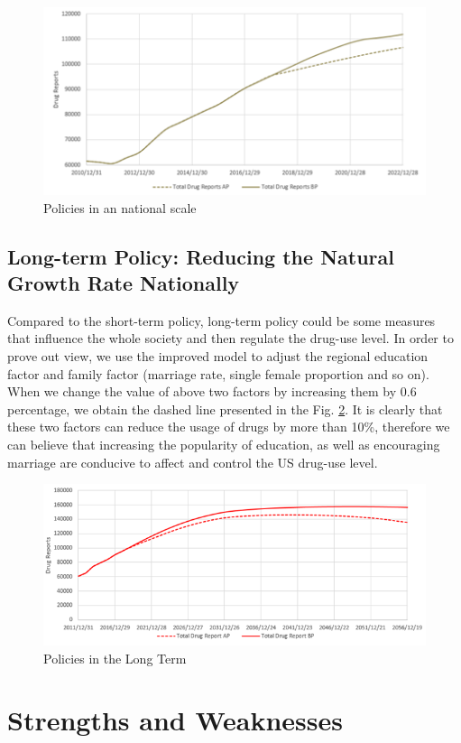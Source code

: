 \documentclass[12pt]{article}
\begin{document}
\begin{figure}[H]
	\centering
	\includegraphics[scale=0.7]{./figures/16.png}
	\caption{Policies in an national scale}
	\label{Fig16}
\end{figure}

\subsection{Long-term Policy: Reducing the Natural Growth Rate Nationally}
Compared to the short-term policy, long-term policy could be some measures that influence the whole society and then regulate the drug-use level. In order to prove out view, we use the improved model to adjust the regional education factor and family factor (marriage rate, single female proportion and so on). When we change the value of above two factors by increasing them by 0.6 percentage, we obtain the dashed line presented in the Fig. \ref{Fig17}. It is clearly that these two factors can reduce the usage of drugs by more than 10\%, therefore we can believe that increasing the popularity of education, as well as encouraging marriage are conducive to affect and control the US drug-use level.
\begin{figure}[H]
	\centering
	\includegraphics[scale=0.7]{./figures/17.png}
	\caption{Policies in the Long Term}
	\label{Fig17}
\end{figure}

\section{Strengths and Weaknesses}
\end{document}
